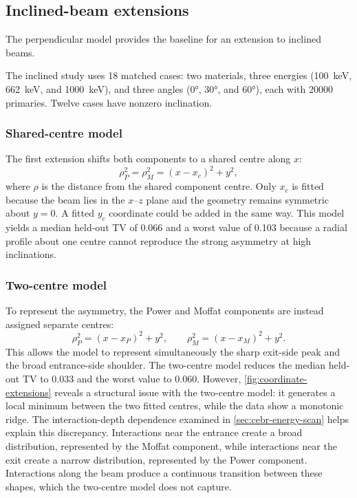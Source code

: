 \subsection{Inclined-beam extensions}

The perpendicular model provides the baseline for an extension to inclined beams.

The inclined study uses 18 matched cases: two materials, three energies (\qty{100}{\kilo\electronvolt}, \qty{662}{\kilo\electronvolt}, and \qty{1000}{\kilo\electronvolt}), and three angles (\ang{0}, \ang{30}, and \ang{60}), each with \num{20000} primaries. Twelve cases have nonzero inclination.

\subsubsection{Shared-centre model}

The first extension shifts both components to a shared centre along $x$:
\begin{equation}
  \rho_P^2=\rho_M^2=(x-x_c)^2+y^2,
\end{equation}
where $\rho$ is the distance from the shared component centre. Only $x_c$ is fitted because the beam lies in the $x$--$z$ plane and the geometry remains symmetric about $y=0$. A fitted $y_c$ coordinate could be added in the same way.
This model yields a median held-out TV of 0.066 and a worst value of 0.103 because a radial profile about one centre cannot reproduce the strong asymmetry at high inclinations.

\subsubsection{Two-centre model}

To represent the asymmetry, the Power and Moffat components are instead assigned separate centres:
\begin{equation}
  \rho_P^2=(x-x_P)^2+y^2,
  \qquad \rho_M^2=(x-x_M)^2+y^2.
\end{equation}
This allows the model to represent simultaneously the sharp exit-side peak and the broad entrance-side shoulder.
The two-centre model reduces the median held-out TV to 0.033 and the worst value to 0.060. However, \cref{fig:coordinate-extensions} reveals a structural issue with the two-centre model: it generates a local minimum between the two fitted centres, while the data show a monotonic ridge. The interaction-depth dependence examined in \cref{sec:cebr-energy-scan} helps explain this discrepancy. Interactions near the entrance create a broad distribution, represented by the Moffat component, while interactions near the exit create a narrow distribution, represented by the Power component. Interactions along the beam produce a continuous transition between these shapes, which the two-centre model does not capture.

